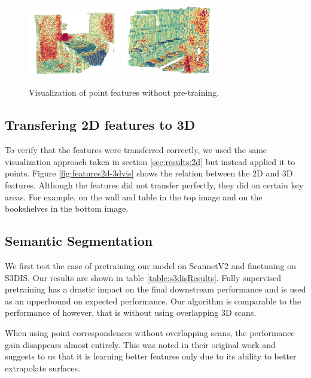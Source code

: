 \documentclass[10pt,twocolumn,letterpaper]{article}
\begin{document}
\begin{figure}
    \centering
    \includegraphics[width=4cm]{images/experiments/scratch-3d.png}
    \includegraphics[width=4cm]{images/experiments/scratch-3d-2.png}
    \caption{Visualization of point features without pre-training.}
    \label{fig:features2dScratchvis}
\end{figure}

\subsection{Transfering 2D features to 3D}
\label{sec:results:2d3d}

To verify that the features were transferred correctly, we used the same visualization approach taken in section \ref{sec:results:2d} but instead applied it to points. Figure \ref{fig:features2d-3dvis} shows the relation between the 2D and 3D features. Although the features did not transfer perfectly, they did on certain key areas. For example, on the wall and table in the top image and on the bookshelves in the bottom image.

\subsection{Semantic Segmentation}
\label{sec:results:semantic}

We first test the case of pretraining our model on ScannetV2 and finetuning on S3DIS. Our results are shown in table \ref{table:s3disResults}. Fully supervised pretraining has a drastic impact on the final downstream performance and is used as an upperbound on expected performance. Our algorithm is comparable to the performance of \cite{xie2020pointcontrast} however, that is without using overlapping 3D scans.

When using point correspondences without overlapping scans, the performance gain disappears almost entirely. This was noted in their original work and suggests to us that it is learning better features only due to its ability to better extrapolate surfaces.
\end{document}
